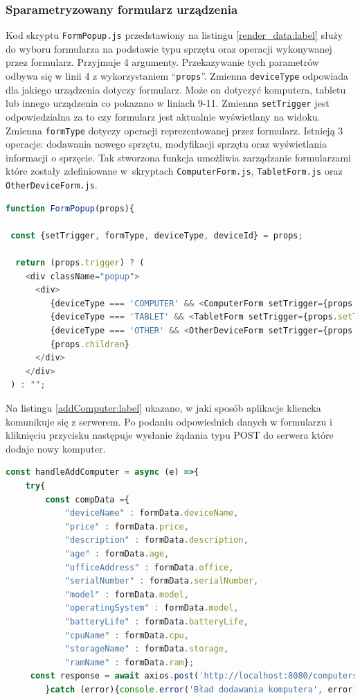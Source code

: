 \subsubsection{Sparametryzowany formularz urządzenia}
Kod skryptu \texttt{FormPopup.js} przedstawiony na listingu \ref{render_data:label} służy do wyboru formularza na podstawie typu sprzętu oraz operacji wykonywanej przez formularz. Przyjmuje 4 argumenty. Przekazywanie tych parametrów odbywa się w linii 4 z wykorzystaniem "`\texttt{props}"'. Zmienna \texttt{deviceType} odpowiada dla jakiego urządzenia dotyczy formularz. Może on dotyczyć komputera, tabletu lub innego urządzenia co pokazano w liniach 9-11. Zmienna \texttt{setTrigger} jest odpowiedzialna za to czy formularz jest aktualnie wyświetlany na widoku. Zmienna \texttt{formType} dotyczy operacji reprezentowanej przez formularz. Istnieją 3 operacje: dodawania nowego sprzętu, modyfikacji sprzętu oraz wyświetlania informacji o sprzęcie. Tak stworzona funkcja umożliwia zarządzanie formularzami które zostały zdefiniowane w~skryptach \texttt{ComputerForm.js}, \texttt{TabletForm.js} oraz \texttt{OtherDeviceForm.js}.
\begin{lstlisting}[language=JavaScript, style=JavaScriptStyle,  caption={Obsługa formularzy}, label={render_data:label}]
function FormPopup(props){
    
 const {setTrigger, formType, deviceType, deviceId} = props;
    
  return (props.trigger) ? (
    <div className="popup">
      <div>
         {deviceType === 'COMPUTER' && <ComputerForm setTrigger={props.setTrigger} formType={formType} deviceId={deviceId}/>}
         {deviceType === 'TABLET' && <TabletForm setTrigger={props.setTrigger} formType={formType} deviceId={deviceId}/>}
         {deviceType === 'OTHER' && <OtherDeviceForm setTrigger={props.setTrigger}  formType={formType} deviceId={deviceId} />}
         {props.children}
      </div>
    </div>
 ) : "";
\end{lstlisting}


Na listingu \ref{addComputer:label} ukazano, w jaki sposób aplikacje kliencka komunikuje się z serwerem. Po podaniu odpowiednich danych w formularzu i kliknięciu przycisku następuje wysłanie żądania typu POST do serwera które dodaje nowy komputer. 
\begin{lstlisting}[language=JavaScript, style=JavaScriptStyle,  caption={Przykładowe zapytanie do serwera dla formularza komputera}, label={addComputer:label}]
const handleAddComputer = async (e) =>{
    try{
        const compData ={
            "deviceName" : formData.deviceName,
            "price" : formData.price,
            "description" : formData.description,
            "age" : formData.age,
            "officeAddress" : formData.office,
            "serialNumber" : formData.serialNumber,
            "model" : formData.model,
            "operatingSystem" : formData.model,
            "batteryLife" : formData.batteryLife,
            "cpuName" : formData.cpu,
            "storageName" : formData.storage,
            "ramName" : formData.ram};
     const response = await axios.post('http://localhost:8080/computers/add', compData, {});
        }catch (error){console.error('Bład dodawania komputera', error)}}
\end{lstlisting}

